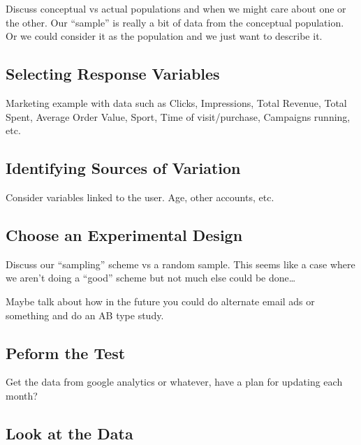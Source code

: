 \documentclass[
]{book}
\theoremstyle{definition}
\theoremstyle{definition}
\theoremstyle{definition}
\theoremstyle{remark}
\begin{document}
Discuss conceptual vs actual populations and when we might care about one or the other. Our ``sample'' is really a bit of data from the conceptual population. Or we could consider it as the population and we just want to describe it.

\hypertarget{selecting-response-variables}{%
\subsection{Selecting Response Variables}\label{selecting-response-variables}}

Marketing example with data such as Clicks, Impressions, Total Revenue, Total Spent, Average Order Value, Sport, Time of visit/purchase, Campaigns running, etc.

\hypertarget{identifying-sources-of-variation}{%
\subsection{Identifying Sources of Variation}\label{identifying-sources-of-variation}}

Consider variables linked to the user. Age, other accounts, etc.

\hypertarget{choose-an-experimental-design}{%
\subsection{Choose an Experimental Design }\label{choose-an-experimental-design}}

Discuss our ``sampling'' scheme vs a random sample. This seems like a case where we aren't doing a ``good'' scheme but not much else could be done\ldots{}

Maybe talk about how in the future you could do alternate email ads or something and do an AB type study.

\hypertarget{peform-the-test}{%
\subsection{Peform the Test }\label{peform-the-test}}

Get the data from google analytics or whatever, have a plan for updating each month?

\hypertarget{look-at-the-data}{%
\subsection{Look at the Data }\label{look-at-the-data}}
\end{document}
